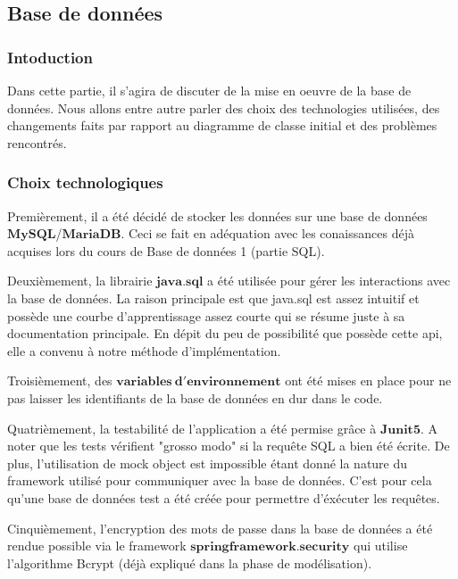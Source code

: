 \subsection{Base de données}
\subsubsection{Intoduction}
\begin{flushleft}
Dans cette partie, il s'agira de discuter de la mise en oeuvre de la base de données. Nous allons entre autre parler des choix des technologies utilisées, des changements faits par rapport au diagramme de classe initial et des problèmes rencontrés.
\end{flushleft}
\subsubsection{Choix technologiques}
\begin{flushleft}
    Premièrement, il a été décidé de stocker les données sur une base de données $\mathbf{MySQL}$/$\mathbf{MariaDB}$. Ceci se fait en adéquation avec les conaissances déjà acquises lors du cours de Base de données 1 (partie SQL). 
\end{flushleft}
\begin{flushleft}
    Deuxièmement, la librairie $\mathbf{java.sql}$ a été utilisée pour gérer les interactions avec la base de données. La raison principale est que java.sql est assez intuitif et possède une courbe d'apprentissage assez courte qui se résume juste à sa documentation principale. En dépit du peu de possibilité que possède cette api, elle a convenu à notre méthode d'implémentation.
\end{flushleft}
\begin{flushleft}
    Troisièmement, des $\mathbf{variables \ d'environnement}$ ont été mises en place pour ne pas laisser les identifiants de la base de données en dur dans le code.
\end{flushleft}
\begin{flushleft}
    Quatrièmement, la testabilité de l'application a été permise grâce à $\mathbf{Junit5}$. A noter que les tests vérifient "grosso modo" si la requête SQL a bien été écrite. De plus, l'utilisation de mock object est impossible étant donné la nature du framework utilisé pour communiquer avec la base de données. C'est pour cela qu'une base de données test a été créée pour permettre d'éxécuter les requêtes.
\end{flushleft}
\begin{flushleft}
    Cinquièmement, l'encryption des mots de passe dans la base de données a été rendue possible via le framework $\mathbf{springframework.security}$ qui utilise l'algorithme Bcrypt (déjà expliqué dans la phase de modélisation).
\end{flushleft}
